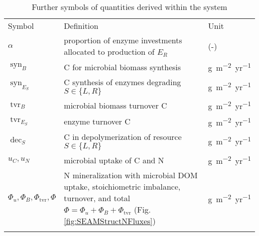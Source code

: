 \begin{table}[t]
\caption{
\label{tab:furtherSymbols}
Further symbols of quantities derived within the system}
\begin{tabular}{lp{4cm}l}
\tophline
Symbol &  Definition  & Unit \\
\middlehline
$\alpha$ & proportion of enzyme investments allocated to production of 
$E_R$ & (-) 
\\
$\operatorname{syn}_B $ & C for microbial biomass synthesis 
& \unit{g~m^{-2}yr^{-1}} 
\\
$\operatorname{syn}_{E_S} $ & C synthesis of enzymes degrading $S \in \{L,R\}$
& \unit{g~m^{-2}yr^{-1}} \\
$\operatorname{tvr}_B $ & microbial biomass turnover C 
& \unit{g~m^{-2}yr^{-1}} \\
$\operatorname{tvr}_{E_S} $ & enzyme turnover C 
& \unit{g~m^{-2}yr^{-1}} \\
$\operatorname{dec}_S $ & C in depolymerization of resource $S \in \{L,R\}$
& \unit{g~m^{-2}yr^{-1}} \\
$u_C,u_N$ & microbial uptake of C and N  
& \unit{g~m^{-2}yr^{-1}} \\
$\Phi_u, \Phi_B, \Phi_{\operatorname{tvr}}, \Phi$ & N mineralization with
microbial DOM uptake, stoichiometric imbalance, turnover, and total $\Phi =
\Phi_u + \Phi_B + \Phi_{\operatorname{tvr}}$ (Fig.
\ref{fig:SEAMStructNFluxes}) & \unit{g~m^{-2}yr^{-1}} \\
\bottomhline
\end{tabular}
\end{table}

